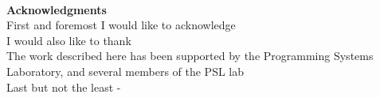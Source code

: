 ~\\[1in] %
\textbf{\Huge Acknowledgments}\\

\noindent 
First and foremost I would like to acknowledge
\\
I would also like to thank
\\
The work described here has been supported by the Programming Systems Laboratory, and several members of the PSL lab
\\
Last but not the least - 

